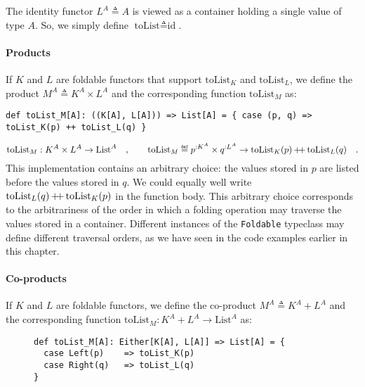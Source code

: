 The identity functor $L^{A}\triangleq A$ is viewed as a container
holding a single value of type $A$. So, we simply define $\text{toList}\triangleq\text{id}$.

\paragraph{Products}

If $K$ and $L$ are foldable functors that support $\text{toList}_{K}$
and $\text{toList}_{L}$, we define the product $M^{A}\triangleq K^{A}\times L^{A}$
and the corresponding function $\text{toList}_{M}$ as:
\begin{lstlisting}
def toList_M[A]: ((K[A], L[A])) => List[A] = { case (p, q) => toList_K(p) ++ toList_L(q) }
\end{lstlisting}
\[
\text{toList}_{M}:K^{A}\times L^{A}\rightarrow\text{List}^{A}\quad,\quad\quad\text{toList}_{M}\triangleq p^{:K^{A}}\times q^{:L^{A}}\rightarrow\text{toList}_{K}(p)\,\pplus\,\text{toList}_{L}(q)\quad.
\]
This implementation contains an arbitrary choice: the values stored
in $p$ are listed before the values stored in $q$. We could equally
well write $\text{toList}_{L}(q)\,{\displaystyle }{+\negmedspace+}\,\text{toList}_{K}(p)$ in
the function body. This arbitrary choice corresponds to the arbitrariness
of the order in which a folding operation may traverse the values
stored in a container. Different instances of the \lstinline!Foldable!
typeclass may define different traversal orders, as we have seen in
the code examples earlier in this chapter.

\paragraph{Co-products}

If $K$ and $L$ are foldable functors, we define the co-product $M^{A}\triangleq K^{A}+L^{A}$
and the corresponding function $\text{toList}_{M}:K^{A}+L^{A}\rightarrow\text{List}^{A}$
as:

\begin{wrapfigure}{l}{0.6\columnwidth}%
\vspace{-0.25\baselineskip}
\begin{lstlisting}
def toList_M[A]: Either[K[A], L[A]] => List[A] = {
  case Left(p)    => toList_K(p)
  case Right(q)   => toList_L(q)
}
\end{lstlisting}

\vspace{-1\baselineskip}
\end{wrapfigure}%

